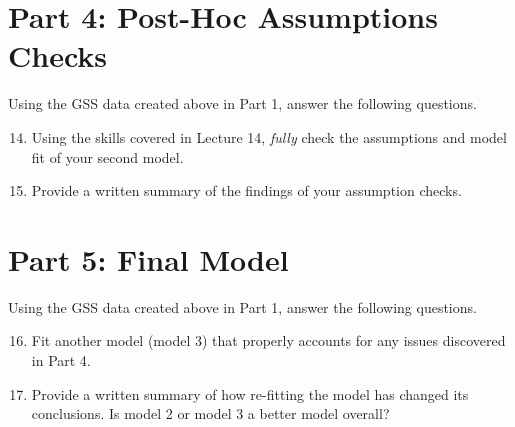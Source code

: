 \documentclass{tufte-handout}
\begin{document}
\vspace{5mm}
\section{Part 4: Post-Hoc Assumptions Checks}
Using the GSS data created above in Part 1, answer the following questions.
\begin{enumerate}
\setcounter{enumi}{13}
\item Using the skills covered in Lecture 14, \textit{fully} check the assumptions and model fit of your second model.
\item Provide a written summary of the findings of your assumption checks.
\end{enumerate}

\vspace{5mm}
\section{Part 5: Final Model}
Using the GSS data created above in Part 1, answer the following questions.
\begin{enumerate}
\setcounter{enumi}{15}
\item Fit another model (model 3) that properly accounts for any issues discovered in Part 4. 
\item Provide a written summary of how re-fitting the model has changed its conclusions. Is model 2 or model 3 a better model overall?
\end{enumerate}

\end{document}
